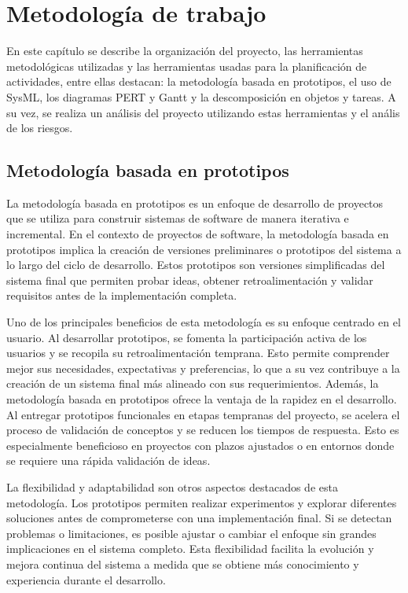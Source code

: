 \chapter{Metodología de trabajo}

\label{sec:metodologia}

En este capítulo se describe la organización del proyecto, las herramientas metodológicas utilizadas y las herramientas usadas para la planificación de actividades, entre ellas destacan: la metodología basada en prototipos, el uso de SysML, los diagramas PERT y Gantt y la descomposición en objetos y tareas. A su vez, se realiza un análisis del proyecto utilizando estas herramientas y el anális de los riesgos.

\section{Metodología basada en prototipos}

La metodología basada en prototipos es un enfoque de desarrollo de proyectos que se utiliza para construir sistemas de software de manera iterativa e incremental. En el contexto de proyectos de software, la metodología basada en prototipos implica la creación de versiones preliminares o prototipos del sistema a lo largo del ciclo de desarrollo. Estos prototipos son versiones simplificadas del sistema final que permiten probar ideas, obtener retroalimentación y validar requisitos antes de la implementación completa.

Uno de los principales beneficios de esta metodología es su enfoque centrado en el usuario. Al desarrollar prototipos, se fomenta la participación activa de los usuarios y se recopila su retroalimentación temprana. Esto permite comprender mejor sus necesidades, expectativas y preferencias, lo que a su vez contribuye a la creación de un sistema final más alineado con sus requerimientos. Además, la metodología basada en prototipos ofrece la ventaja de la rapidez en el desarrollo. Al entregar prototipos funcionales en etapas tempranas del proyecto, se acelera el proceso de validación de conceptos y se reducen los tiempos de respuesta. Esto es especialmente beneficioso en proyectos con plazos ajustados o en entornos donde se requiere una rápida validación de ideas.

La flexibilidad y adaptabilidad son otros aspectos destacados de esta metodología. Los prototipos permiten realizar experimentos y explorar diferentes soluciones antes de comprometerse con una implementación final. Si se detectan problemas o limitaciones, es posible ajustar o cambiar el enfoque sin grandes implicaciones en el sistema completo. Esta flexibilidad facilita la evolución y mejora continua del sistema a medida que se obtiene más conocimiento y experiencia durante el desarrollo.

